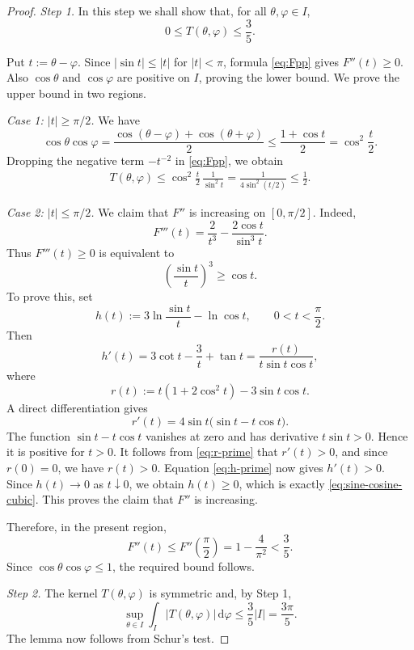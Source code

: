 \documentclass[10pt,a4paper]{amsart}
\newcommand{\abs}[1]{\left\lvert #1\right\rvert}
\newcommand{\dd}{\,\mathrm{d}}
\begin{document}
\begin{proof}
    \emph{Step 1.} In this step we shall show that, for all $\theta,\varphi\in I$,
    \begin{equation}\label{eq:k-bound}
        0\leq T(\theta,\varphi)\leq\frac35.
    \end{equation}

Put $t:=\theta-\varphi$.  Since $\abs{\sin t}\leq\abs t$ for $\abs t<\pi$, formula \eqref{eq:Fpp} gives $F''(t)\geq0$.  Also $\cos\theta$ and $\cos\varphi$ are positive on $I$, proving the lower bound. We prove the upper bound in two regions.

\smallskip
\noindent\emph{Case 1: $\abs t\geq\pi/2$.}
We have
\begin{equation}\label{eq:cos-product-bound}
\cos\theta\cos\varphi = \frac{\cos(\theta-\varphi)+\cos(\theta+\varphi)}{2}
\leq \frac{1+\cos t}{2}
=\cos^2\frac t2.
\end{equation}
Dropping the negative term $-t^{-2}$ in \eqref{eq:Fpp}, we obtain
\begin{align*}
T(\theta,\varphi)
\leq \cos^2\frac t2\,\frac{1}{\sin^2t}
=\frac{1}{4\sin^2(t/2)}
\leq\frac12.
\end{align*}

\smallskip
\noindent\emph{Case 2: $\abs t\leq\pi/2$.}
We claim that $F''$ is increasing on $[0,\pi/2]$.  Indeed,
\begin{equation}\label{eq:F-third}
F'''(t)=\frac{2}{t^3}-\frac{2\cos t}{\sin^3t}.
\end{equation}
Thus $F'''(t)\geq0$ is equivalent to
\begin{equation}\label{eq:sine-cosine-cubic}
\left(\frac{\sin t}{t}\right)^3\geq\cos t.
\end{equation}
To prove this, set
\[
h(t):=3\ln\frac{\sin t}{t}-\ln\cos t,
\qquad 0<t<\frac{\pi}{2}.
\]
Then
\begin{equation}\label{eq:h-prime}
h'(t)=3\cot t-\frac3t+\tan t
=\frac{r(t)}{t\sin t\cos t},
\end{equation}
where
\[
r(t):=t(1+2\cos^2t)-3\sin t\cos t.
\]
A direct differentiation gives
\begin{equation}\label{eq:r-prime}
r'(t)=4\sin t\bigl(\sin t-t\cos t\bigr).
\end{equation}
The function $\sin t-t\cos t$ vanishes at zero and has derivative $t\sin t>0$.  Hence it is positive for $t>0$.  It follows from \eqref{eq:r-prime} that $r'(t)>0$, and since $r(0)=0$, we have $r(t)>0$.  Equation \eqref{eq:h-prime} now gives $h'(t)>0$.  Since $h(t)\to0$ as $t\downarrow0$, we obtain $h(t)\geq0$, which is exactly \eqref{eq:sine-cosine-cubic}.  This proves the claim that $F''$ is increasing.

Therefore, in the present region,
\[
F''(t)\leq F''\left(\frac{\pi}{2}\right)
=1-\frac{4}{\pi^2}<\frac35.
\]
Since $\cos\theta\cos\varphi\leq1$, the required bound follows.

\medskip

\emph{Step 2.} The kernel $T(\theta,\varphi)$ is symmetric and, by Step 1,
\[
\sup_{\theta\in I}\int_I\abs{T(\theta,\varphi)}\dd\varphi
\leq \frac35\abs I=\frac{3\pi}{5}.
\]
The lemma now follows from Schur's test.
\end{proof}
\end{document}
